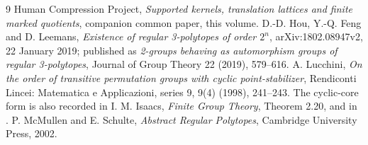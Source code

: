 \begin{thebibliography}{9}
 Human Compression Project, \emph{Supported kernels, translation lattices and finite marked quotients}, companion common paper, this volume.
 D.-D. Hou, Y.-Q. Feng and D. Leemans,
\emph{Existence of regular 3-polytopes of order $2^n$},
arXiv:1802.08947v2, 22 January 2019; published as
\emph{2-groups behaving as automorphism groups of regular 3-polytopes},
Journal of Group Theory 22 (2019), 579--616.
 A. Lucchini, \emph{On the order of transitive permutation groups with cyclic point-stabilizer}, Rendiconti Lincei: Matematica e Applicazioni, series 9, 9(4) (1998), 241--243. The cyclic-core form is also recorded in I. M. Isaacs, \emph{Finite Group Theory}, Theorem 2.20,
and in \cite[Proposition 2.9]{HFL}.
 P. McMullen and E. Schulte, \emph{Abstract Regular
Polytopes}, Cambridge University Press, 2002.
\end{thebibliography}


